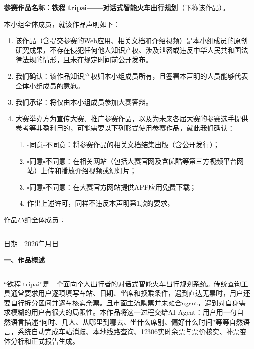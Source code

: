 ﻿\documentclass[12pt,a4paper,UTF8,fontset=windows]{ctexart}
\newcommand{\sectionline}{\par\vspace{0.2em}\noindent\rule{\linewidth}{0.4pt}\par}
\newcommand{\cnsection}[1]{%
  \clearpage
  \begin{center}
    {\Large\bfseries #1}
  \end{center}
  \sectionline
  \addcontentsline{toc}{section}{#1}
}
\begin{document}
\noindent\textbf{参赛作品名称：铁程 tripai——对话式智能火车出行规划}（下称该作品）。

\medskip
\noindent 本小组全体成员，就该作品声明如下：

\begin{enumerate}[label=\arabic*、,leftmargin=2em]
  \item 该作品（含提交参赛的Web应用、相关文档和介绍视频）是本小组成员的原创研究成果，不存在侵犯任何他人知识产权、涉及泄密或违反中华人民共和国法律法规的情形，且未在规定时间前公开发布。
  \item 我们确认：该作品知识产权归本小组成员所有，且签署本声明的人员能够代表全体小组成员的意愿。
  \item 我们承诺：将仅由本小组成员参加大赛答辩。
  \item 大赛举办方为宣传大赛、推广参赛作品，以及为未来各届大赛的参赛选手提供参考等非盈利目的，可能需要以下列形式使用参赛作品，就此我们确认：
  \begin{enumerate}[label=（\arabic*）,leftmargin=3em]
    \item $\square$同意\quad $\square$不同意：将参赛作品的相关文档结集出版（含公开发行）；
    \item $\square$同意\quad $\square$不同意：在相关网站（包括大赛官网及含优酷等第三方视频平台网站）上传和播放介绍视频或幻灯片；
    \item $\square$同意\quad $\square$不同意：在大赛官方网站提供APP应用免费下载；
    \item 作出上述许可，同样不违反本声明第1款的要求。
  \end{enumerate}
\end{enumerate}

\vspace{1.6em}
\noindent 作品小组全体成员：\rule[-0.2em]{7cm}{0.4pt}

\vspace{0.7em}
\noindent 日期：2026年\underline{\hspace{1.1em}}月\underline{\hspace{1.1em}}日

\newpage
\tableofcontents
\markboth{}{}   %

\cnsection{一、作品概述}

“铁程 tripai”是一个面向个人出行者的对话式智能火车出行规划系统。传统查询工具通常要求用户逐项填写车站、日期、坐席和换乘条件，遇到直达无票时，用户还要自行拆分区间并逐车核实余票。且市面主流购票并未融合agent，遇到对自身需求模糊的用户有很大的局限性。本作品将这一过程交给AI Agent：用户用一句自然语言描述“何时、几人、从哪里到哪去、坐什么席别、偏好什么时间”等等自然语言，系统自动完成车站消歧、本地线路查询、12306实时余票与票价核实、补票变体分析和正式报告生成。
\end{document}
